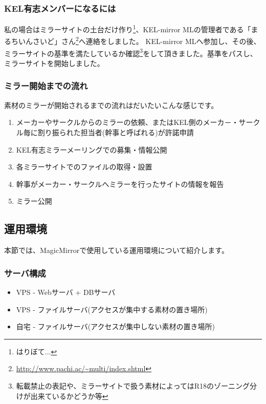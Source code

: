 \subsubsection{KEL有志メンバーになるには}

私の場合はミラーサイトの土台だけ作り\footnote{はりぼて...}、KEL-mirror MLの管理者である「まるちいんさいど」さん\footnote{\url{http://www.pachi.ac/~multi/index.shtml}}へ連絡をしました。%
KEL-mirror MLへ参加し、その後、ミラーサイトの基準を満たしているか確認\footnote{転載禁止の表記や、ミラーサイトで扱う素材によってはR18のゾーニング分けが出来ているかどうか等}をして頂きました。基準をパスし、ミラーサイトを開始しました。

\subsubsection{ミラー開始までの流れ}

素材のミラーが開始されるまでの流れはだいたいこんな感じです。\cite{XES}
\begin{enumerate}
 \item メーカーやサークルからのミラーの依頼、またはKEL側のメーカ－・サークル毎に割り振られた担当者(幹事と呼ばれる)が許諾申請
 \item KEL有志ミラーメーリングでの募集・情報公開
 \item 各ミラーサイトでのファイルの取得・設置
 \item 幹事がメーカー・サークルへミラーを行ったサイトの情報を報告
 \item ミラー公開
\end{enumerate}


\subsection{運用環境}
本節では、MagicMirrorで使用している運用環境について紹介します。

\subsubsection{サーバ構成}

\begin{itemize}
 \item VPS - Webサーバ + DBサーバ 
 \item VPS - ファイルサーバ(アクセスが集中する素材の置き場所)
 \item 自宅 - ファイルサーバ(アクセスが集中しない素材の置き場所)
\end{itemize}

